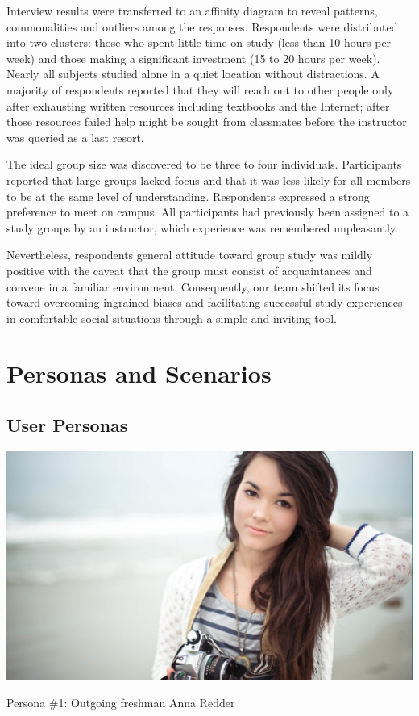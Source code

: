 \documentclass{sigchi-ext}
\begin{document}
Interview results were transferred to an affinity diagram to reveal patterns,
commonalities and outliers among the responses.  Respondents were distributed
into two clusters: those who spent little time on study (less than 10 hours per
week) and those making a significant investment (15 to 20 hours per week).
Nearly all subjects studied alone in a quiet location without distractions. A
majority of respondents reported that they will reach out to other people only
after exhausting written resources including textbooks and the Internet; after
those resources failed help might be sought from classmates before the
instructor was queried as a last resort.

The ideal group size was discovered to be three to four individuals.
Participants reported that large groups lacked focus and that it was less
likely for all members to be at the same level of understanding. Respondents
expressed a strong preference to meet on campus. All participants had
previously been assigned to a study groups by an instructor, which experience
was remembered unpleasantly.

Nevertheless, respondents general attitude toward group study was mildly positive with the
caveat that the group must consist of acquaintances and convene in a familiar
environment.  Consequently, our team shifted its focus toward overcoming ingrained biases and
facilitating successful study experiences in comfortable social situations
through a simple and inviting tool.  


\section{Personas and Scenarios}

\subsection{User Personas}

\begin{marginfigure}[-14pc]
  \begin{minipage}{\marginparwidth}
    \centering
  \includegraphics[width=0.9\marginparwidth]{figures/anna.png}
    \caption{Persona \#1: Outgoing freshman Anna Redder}
  \end{minipage}
\end{marginfigure}
\end{document}
